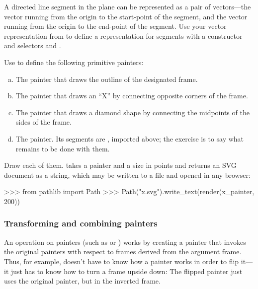 \begin{exerciseGroup}
\label{Exercise 2.48}
 A directed line segment in the
plane can be represented as a pair of vectors---the vector running from the
origin to the start-point of the segment, and the vector running from the
origin to the end-point of the segment.  Use your vector representation from
 to define a representation for segments with a constructor
 and selectors  and
.

\label{Exercise 2.49}
 Use 
to define the following primitive painters:

\begin{enumerate}[a.]

\item
The painter that draws the outline of the designated frame.

\item
The painter that draws an ``X'' by connecting opposite corners of the frame.

\item
The painter that draws a diamond shape by connecting the midpoints of the sides
of the frame.

\item
The  painter.  Its segments are , imported
above; the exercise is to say what remains to be done with them.

\end{enumerate}

\noindent
Draw each of them.   takes a painter and a size in points and
returns an SVG document as a string, which may be written to a file and opened
in any browser:

\begin{codeBlock}
>>> from pathlib import Path
>>> Path("x.svg").write_text(render(x_painter, 200))
\end{codeBlock}
\end{exerciseGroup}

\subsubsection*{Transforming and combining painters}

An operation on painters (such as  or ) works by
creating a painter that invokes the original painters with respect to frames
derived from the argument frame.  Thus, for example,  doesn't
have to know how a painter works in order to flip it---it just has to know how
to turn a frame upside down: The flipped painter just uses the original
painter, but in the inverted frame.

